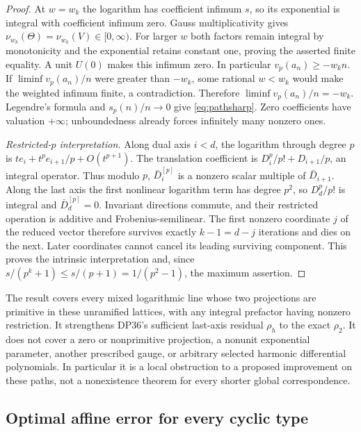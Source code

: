 \documentclass[11pt,a4paper]{article}
\theoremstyle{definition}\newtheorem{remark}[theorem]{Remark}
\newcommand{\vp}{v_p}\newcommand{\dR}{\mathrm{dR}}\newcommand{\crys}{\mathrm{crys}}
\begin{document}
\begin{proof}
At $w=w_k$ the logarithm has coefficient infimum $s$, so its exponential is integral with coefficient infimum zero. Gauss multiplicativity gives
$\nu_{w_k}(\Theta)=\nu_{w_k}(V)\in[0,\infty)$.
For larger $w$ both factors remain integral by monotonicity and the exponential retains constant one, proving the asserted finite equality. A unit $U(0)$ makes this infimum zero.
In particular $\vp(a_n)\ge-w_kn$. If $\liminf\vp(a_n)/n$ were greater than $-w_k$, some rational $w<w_k$ would make the weighted infimum finite, a contradiction. Therefore $\liminf\vp(a_n)/n=-w_k$.
Legendre's formula and $s_p(n)/n\to0$ give \eqref{eq:pathsharp}. Zero coefficients have valuation $+\infty$; unboundedness already forces infinitely many nonzero ones.

\emph{Restricted-$p$ interpretation.}
Along dual axis $i<d$, the logarithm through degree $p$ is
$te_i+t^pe_{i+1}/p+O(t^{p+1})$.
The translation coefficient is
$D_i^p/p!+D_{i+1}/p$, an integral operator. Thus modulo $p$,
$\bar D_i^{[p]}$ is a nonzero scalar multiple of $\bar D_{i+1}$.
Along the last axis the first nonlinear logarithm term has degree $p^2$, so $D_d^p/p!$ is integral and $\bar D_d^{[p]}=0$.
Invariant directions commute, and their restricted operation is additive and Frobenius-semilinear. The first nonzero coordinate $j$ of the reduced vector therefore survives exactly $k-1=d-j$ iterations and dies on the next. Later coordinates cannot cancel its leading surviving component. This proves the intrinsic interpretation and, since $s/(p^k+1)\le s/(p+1)=1/(p^2-1)$, the maximum assertion.
\end{proof}

The result covers every mixed logarithmic line whose two projections are primitive in these unramified lattices, with any integral prefactor having nonzero restriction. It strengthens DP36's sufficient last-axis residual $\rho_h$ to the exact $\rho_2$. It does not cover a zero or nonprimitive projection, a nonunit exponential parameter, another prescribed gauge, or arbitrary selected harmonic differential polynomials. In particular it is a local obstruction to a proposed improvement on these paths, not a nonexistence theorem for every shorter global correspondence.


\subsection{Optimal affine error for every cyclic type}
\end{document}

